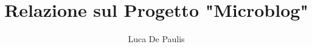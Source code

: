 \documentclass[italian,oneside,headinclude,10pt]{scrartcl}
\begin{document}
\author{Luca De Paulis}
\title{Relazione sul Progetto "Microblog"}
\maketitle







\end{document}
